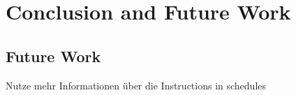\chapter{Conclusion and Future Work}
\section{Future Work}
Nutze mehr Informationen über die Instructions in schedules